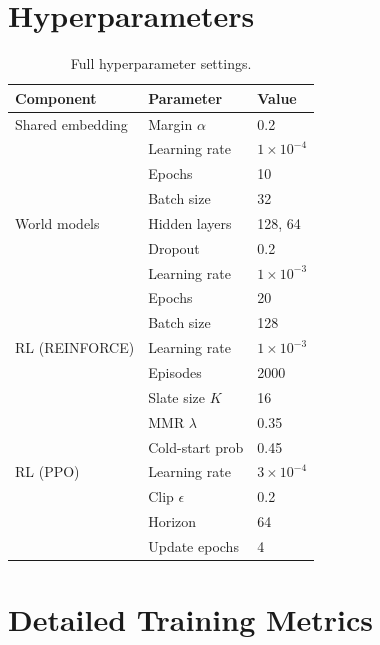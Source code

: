 \documentclass[11pt]{article}
\begin{document}
\appendix

\section{Hyperparameters}
\label{app:hparams}

\begin{table}[h]
\centering
\small
\begin{tabular}{lll}
\toprule
\textbf{Component} & \textbf{Parameter} & \textbf{Value} \\
\midrule
Shared embedding & Margin $\alpha$ & 0.2 \\
& Learning rate & $1 \times 10^{-4}$ \\
& Epochs & 10 \\
& Batch size & 32 \\
\midrule
World models & Hidden layers & 128, 64 \\
& Dropout & 0.2 \\
& Learning rate & $1 \times 10^{-3}$ \\
& Epochs & 20 \\
& Batch size & 128 \\
\midrule
RL (REINFORCE) & Learning rate & $1 \times 10^{-3}$ \\
& Episodes & 2000 \\
& Slate size $K$ & 16 \\
& MMR $\lambda$ & 0.35 \\
& Cold-start prob & 0.45 \\
\midrule
RL (PPO) & Learning rate & $3 \times 10^{-4}$ \\
& Clip $\epsilon$ & 0.2 \\
& Horizon & 64 \\
& Update epochs & 4 \\
\bottomrule
\end{tabular}
\caption{Full hyperparameter settings.}
\label{tab:hparams}
\end{table}

\section{Detailed Training Metrics}
\label{app:metrics}
\end{document}

